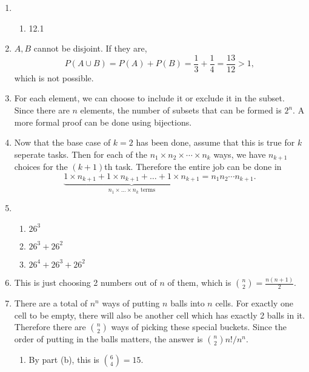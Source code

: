 \documentclass{article}
\begin{document}
\begin{enumerate}
    \item \begin{enumerate}
        \item 12.1
    \end{enumerate}

    \item $A, B$ cannot be disjoint. If they are, \[
        P(A \cup B) = P(A) + P(B) = \frac{1}{3} + \frac{1}{4} = \frac{13}{12} > 1,
    \]
    which is not possible.

    \item For each element, we can choose to include it or exclude it in the subset. Since there 
    are $n$ elements, the number of subsets that can be formed is $2^{n}$. A more formal proof 
    can be done using bijections.

    \item Now that the base case of $k = 2$ has been done, assume that this is true for $k$ 
    seperate tasks. Then for each of the $n_1 \times n_2 \times \cdots \times n_k$ ways, we 
    have $n_{k + 1}$ choices for the $(k + 1)$th task. Therefore the entire job can be done in 
    \[ \underbrace{1 \times n_{k + 1} + 1 \times n_{k + 1} + \dots + 1 \times n_{k + 1}}
    _{n_1 \times ... \times n_k \text{ terms}} = n_1 n_2 \cdots n_{k + 1}. \]

    \item \begin{enumerate}
        \item $26^3$
        \item $26^3 + 26^2$
        \item $26^4 + 26^3 + 26^2$
    \end{enumerate}

    \item This is just choosing 2 numbers out of $n$ of them, which is $\binom{n}{2} 
    = \frac{n(n + 1)}{2}$.

    \item There are a total of $n^n$ ways of putting $n$ balls into $n$ cells. For exactly one 
    cell to be empty, there will also be another cell which has exactly 2 balls in it. Therefore 
    there are $\binom{n}{2}$ ways of picking these special buckets. Since the order of putting 
    in the balls matters, the answer is $\binom{n}{2}n! / n^n$.

    \begin{enumerate}
        \item By part (b), this is $\binom{6}{4} = 15$.


\end{enumerate}
\end{enumerate}
\end{document}
